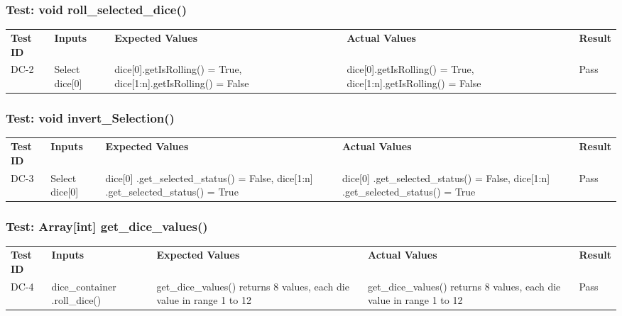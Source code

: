 \documentclass[12pt, titlepage]{article}
\begin{document}
\subsubsection{Test: void roll\_selected\_dice()}
\begin{tabularx}{\textwidth}{|p{2cm}|p{3.5cm}|p{4cm}|p{4cm}|p{1.5cm}|}
    \cline{1-5}
    \textbf{Test ID} & \textbf{Inputs} & \textbf{Expected Values} & \textbf{Actual Values} & \textbf{Result} \\
    \cline{1-5}
    DC-2 & Select dice[0] & dice[0].getIsRolling() = True, dice[1:n].getIsRolling() = False & dice[0].getIsRolling() = True, dice[1:n].getIsRolling() = False & Pass \\
    \cline{1-5}
\end{tabularx}

\subsubsection{Test: void invert\_Selection()}
\begin{tabularx}{\textwidth}{|p{2cm}|p{3.5cm}|p{4cm}|p{4cm}|p{1.5cm}|}
    \cline{1-5}
    \textbf{Test ID} & \textbf{Inputs} & \textbf{Expected Values} & \textbf{Actual Values} & \textbf{Result} \\
    \cline{1-5}
    DC-3 & Select dice[0] & dice[0] .get\_selected\_status() = False, dice[1:n] .get\_selected\_status() = True & dice[0] .get\_selected\_status() = False, dice[1:n] .get\_selected\_status() = True & Pass \\
    \cline{1-5}
\end{tabularx}

\subsubsection{Test: Array[int] get\_dice\_values()}
\begin{tabularx}{\textwidth}{|p{2cm}|p{3.5cm}|p{4cm}|p{4cm}|p{1.5cm}|}
    \cline{1-5}
    \textbf{Test ID} & \textbf{Inputs} & \textbf{Expected Values} & \textbf{Actual Values} & \textbf{Result} \\
    \cline{1-5}
    DC-4 & dice\_container .roll\_dice() & get\_dice\_values() returns 8 values, each die value in range 1 to 12 & get\_dice\_values() returns 8 values, each die value in range 1 to 12 & Pass \\
    \cline{1-5}
\end{tabularx}
\end{document}
